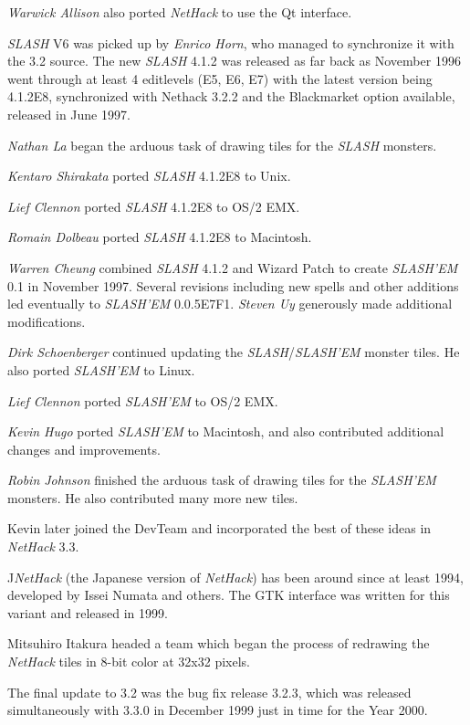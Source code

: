 {\it Warwick Allison\/} also ported {\it NetHack\/} to use the Qt interface.

{\it SLASH\/} V6 was picked up by {\it Enrico Horn}, who managed to synchronize it with
the 3.2 source.  The new {\it SLASH\/} 4.1.2 was released as far back as November
1996 went through at least 4 editlevels (E5, E6, E7)
with the latest version being 4.1.2E8,  synchronized with Nethack 3.2.2 and
the Blackmarket option available,  released in June 1997.

{\it Nathan La\/} began the arduous task of drawing tiles for the {\it SLASH\/} monsters.

{\it Kentaro Shirakata\/} ported {\it SLASH\/} 4.1.2E8 to Unix.

{\it Lief Clennon\/} ported {\it SLASH\/} 4.1.2E8 to OS/2 EMX.

{\it Romain Dolbeau\/} ported {\it SLASH\/} 4.1.2E8 to Macintosh.

{\it Warren Cheung\/} combined {\it SLASH\/} 4.1.2 and Wizard Patch to create
{\it SLASH'EM\/} 0.1 in November 1997.  Several revisions including new spells and
other additions led eventually to {\it SLASH'EM\/} 0.0.5E7F1. {\it Steven Uy\/}
generously made additional modifications.

{\it Dirk Schoenberger\/} continued updating the {\it SLASH\/}/{\it SLASH'EM\/} monster
tiles.  He also ported {\it SLASH'EM\/} to Linux.

{\it Lief Clennon\/} ported {\it SLASH'EM\/} to OS/2 EMX.

{\it Kevin Hugo\/} ported {\it SLASH'EM\/} to Macintosh,  and also contributed
additional changes and improvements.

{\it Robin Johnson\/} finished the arduous task of drawing tiles for the
{\it SLASH'EM\/} monsters.  He also contributed many more new tiles.

Kevin later joined the
DevTeam and incorporated the best of these ideas in {\it NetHack\/} 3.3.

J{\it NetHack\/} (the Japanese version of {\it NetHack\/}) has been around since at least
1994, developed by Issei Numata and others. The GTK interface was written
for this variant and released in 1999.

Mitsuhiro Itakura headed a team which began the process of redrawing the
{\it NetHack\/} tiles in 8-bit color at 32x32 pixels.

The final update to 3.2 was the bug fix release 3.2.3, which was released
simultaneously with 3.3.0 in December 1999 just in time for the Year 2000.

